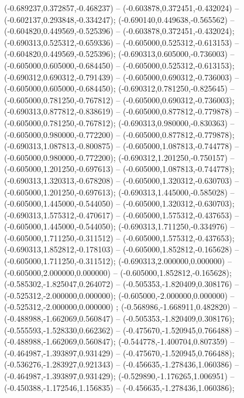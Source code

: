  (-0.689237,0.372857,-0.468237) -- (-0.603878,0.372451,-0.432024) -- (-0.602137,0.293848,-0.334247);
 (-0.690140,0.449638,-0.565562) -- (-0.604820,0.449569,-0.525396) -- (-0.603878,0.372451,-0.432024);
 (-0.690313,0.525312,-0.659336) -- (-0.605000,0.525312,-0.613153) -- (-0.604820,0.449569,-0.525396);
 (-0.690313,0.605000,-0.736003) -- (-0.605000,0.605000,-0.684450) -- (-0.605000,0.525312,-0.613153);
 (-0.690312,0.690312,-0.791439) -- (-0.605000,0.690312,-0.736003) -- (-0.605000,0.605000,-0.684450);
 (-0.690312,0.781250,-0.825645) -- (-0.605000,0.781250,-0.767812) -- (-0.605000,0.690312,-0.736003);
 (-0.690313,0.877812,-0.838619) -- (-0.605000,0.877812,-0.779878) -- (-0.605000,0.781250,-0.767812);
 (-0.690313,0.980000,-0.830363) -- (-0.605000,0.980000,-0.772200) -- (-0.605000,0.877812,-0.779878);
 (-0.690313,1.087813,-0.800875) -- (-0.605000,1.087813,-0.744778) -- (-0.605000,0.980000,-0.772200);
 (-0.690312,1.201250,-0.750157) -- (-0.605000,1.201250,-0.697613) -- (-0.605000,1.087813,-0.744778);
 (-0.690313,1.320313,-0.678208) -- (-0.605000,1.320312,-0.630703) -- (-0.605000,1.201250,-0.697613);
 (-0.690313,1.445000,-0.585028) -- (-0.605000,1.445000,-0.544050) -- (-0.605000,1.320312,-0.630703);
 (-0.690313,1.575312,-0.470617) -- (-0.605000,1.575312,-0.437653) -- (-0.605000,1.445000,-0.544050);
 (-0.690313,1.711250,-0.334976) -- (-0.605000,1.711250,-0.311512) -- (-0.605000,1.575312,-0.437653);
 (-0.690313,1.852812,-0.178103) -- (-0.605000,1.852812,-0.165628) -- (-0.605000,1.711250,-0.311512);
 (-0.690313,2.000000,0.000000) -- (-0.605000,2.000000,0.000000) -- (-0.605000,1.852812,-0.165628);
 (-0.585302,-1.825047,0.264072) -- (-0.505353,-1.820409,0.308176) -- (-0.525312,-2.000000,0.000000);
 (-0.605000,-2.000000,0.000000) -- (-0.525312,-2.000000,0.000000) ;
 (-0.568986,-1.668911,0.482820) -- (-0.488988,-1.662069,0.560847) -- (-0.505353,-1.820409,0.308176);
 (-0.555593,-1.528330,0.662362) -- (-0.475670,-1.520945,0.766488) -- (-0.488988,-1.662069,0.560847);
 (-0.544778,-1.400704,0.807359) -- (-0.464987,-1.393897,0.931429) -- (-0.475670,-1.520945,0.766488);
 (-0.536276,-1.283927,0.921343) -- (-0.456635,-1.278436,1.060386) -- (-0.464987,-1.393897,0.931429);
 (-0.529890,-1.176265,1.006951) -- (-0.450388,-1.172546,1.156835) -- (-0.456635,-1.278436,1.060386);
